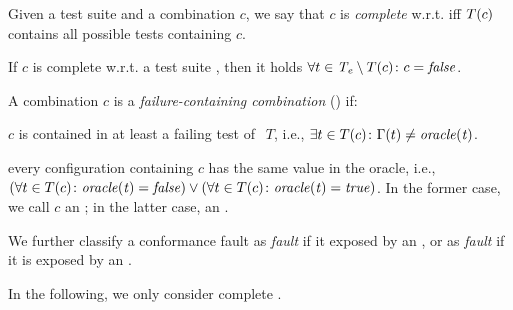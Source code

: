 \begin{tikzborder}{\cite{Gargantini16:validation}}
\begin{tikzborder}{\cite{gargantini_combinatorial_2017}}
\begin{tikzborder}{\cite{garn2019}}
\begin{tikzborder}{\cite{arcaini2019achieving}}
\begin{tikzborder}{\cite{arcaini2019varivolution}}
		\begin{mydef}\label{def:combCompl}
			Given a test suite \testSuite and a combination $c$, we say that $c$ is \emph{complete} w.r.t. \testSuite iff $T(c)$ contains all possible tests containing $c$.
		\end{mydef}
		
		
		\begin{lemma}\label{lemma:combComplLemma}
			If $c$ is complete w.r.t. a test suite \testSuite, then it holds $\forall t \in \mathit{T_e} \setminus T(c) \colon c = \mathit{false}$.
		\end{lemma}
		
		\begin{mydef}\label{def:fcc}
			A combination $c$ is a \emph{failure-containing combination} (\fcc) if:
			\begin{compactenum}
				\item $c$ is contained in at least a failing test of $~~T$, i.e., $\exists t \in T(c) \colon \Gamma(t) \neq \mathit{oracle(t)}$.
				\item every configuration containing $c$ has the same value in the oracle, i.e., $(\forall t \in T(c) \colon \mathit{oracle(t)} = \mathit{false}) \vee (\forall t \in T(c) \colon \mathit{oracle(t)} = \mathit{true})$. In the former case, we call $c$ an \emph{\underConstr} \fcc; in the latter case, an \emph{\overConstr} \fcc.
			\end{compactenum}
			
			We further classify a conformance fault as \emph{\underConstr fault} if it exposed by an \underConstr \fcc, or as \emph{\overConstr fault} if it is exposed by an \overConstr \fcc.
		\end{mydef}
		
		In the following, we only consider complete \fccs.\be
		

\end{tikzborder}
\end{tikzborder}
\end{tikzborder}
\end{tikzborder}
\end{tikzborder}

